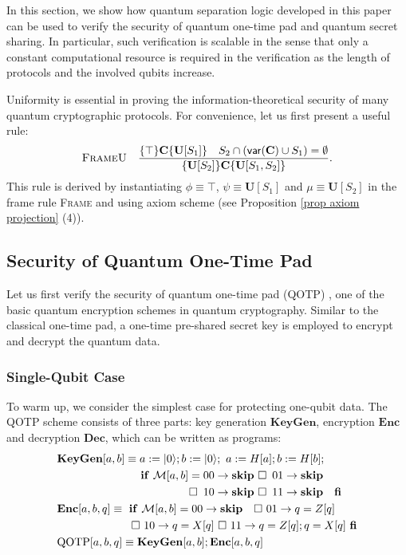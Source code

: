 \documentclass[conference,compsoc, 10pt]{IEEEtran}
\newcommand{\jh}[1]{\textit{\color{red}[JH] : #1}}
\newcommand{\lz}[1]{\textit{\color{blue}[LZ] : #1}}
\newcommand {\cM } {{\mathcal{M}}}
\newcommand {\var } {\mathsf{var}}
\newcommand {\unia } {{\mathbf{U}}}
\newcommand {\prog } {{\mathbf{C}}}
\def\>{\ensuremath{\rangle}}
\begin{document}
	In this section, we show how quantum separation logic developed in this paper can be used to verify the security of quantum one-time pad and quantum secret sharing. In particular, such verification is scalable in the sense that only a constant computational resource is required in the verification as the length of protocols and the involved qubits increase.
	
	Uniformity is essential in proving the information-theoretical security of many quantum cryptographic protocols. For convenience, let us first present a useful rule: 
	\begin{equation}
	\label{fig proof system uniform}
	\textsc{FrameU}\quad \frac{\{\top\}\prog\{\unia[S_1]\}\quad S_2\cap(\var(\prog)\cup S_1)=\emptyset}{\{\unia[S_2]\}\prog\{\unia[S_1,S_2]\}}.
	\end{equation}
	This rule is derived by instantiating $\phi\equiv\top$,  $\psi\equiv\unia[S_1]$ and $\mu\equiv\unia[S_2]$ in the frame rule \textsc{Frame} and using axiom scheme (see Proposition \ref{prop axiom projection} (4)).
	
	\subsection{Security of Quantum One-Time Pad}
	
	Let us first verify the security of quantum one-time pad (QOTP) \cite{MTW00, BR03}, one of the basic quantum encryption schemes in quantum cryptography. Similar to the classical one-time pad, a one-time pre-shared secret key is employed to encrypt and decrypt the quantum data.
	
	\subsubsection{Single-Qubit Case} To warm up, we consider the simplest case for protecting one-qubit data.   
	The QOTP scheme consists of three parts: key generation $\mathbf{KeyGen}$, encryption $\mathbf{Enc}$ and decryption $\mathbf{Dec}$, which can be written as programs:
	{\small
		\begin{align*}
		&\mathbf{KeyGen}[a,b] \equiv  a := |0\>; b := |0\>; \ 
		a := H[a];  b := H[b];  \\
		&\qquad\qquad\qquad\quad\ \, \mathbf{if}\ \cM[a,b]=00\rightarrow \mathbf{skip}\ \square\ \ \! 01\rightarrow \mathbf{skip}\ \\
		&\qquad\qquad\qquad\quad\ \, \qquad\qquad\  \square\ \ \!  10\rightarrow \mathbf{skip}\ \square\ \ \!  11\rightarrow \mathbf{skip} \quad \mathbf{fi}\\ 
		&\mathbf{Enc}[a,b,q] \equiv\  \mathbf{if}\ \cM[a,b]=00\rightarrow \mathbf{skip}\ \ \ \square \  01\rightarrow q = Z[q]\\
		&\qquad\qquad\qquad\ \  \square\ 10\rightarrow q = X[q]\ \square\ 11\rightarrow q = Z[q];q = X[q]\  \mathbf{fi} \\
		&{\rm QOTP}[a,b,q] \equiv  \mathbf{KeyGen}[a,b]; \mathbf{Enc}[a,b,q]
		\end{align*}
	}\\[-0.8cm]
	
\end{document}
